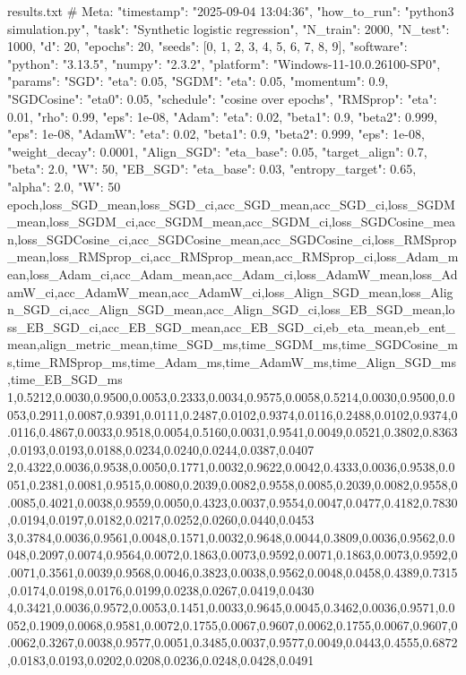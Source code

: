 \begin{filecontents*}{results.txt}
# Meta: {"timestamp": "2025-09-04 13:04:36", "how_to_run": "python3 simulation.py", "task": "Synthetic logistic regression", "N_train": 2000, "N_test": 1000, "d": 20, "epochs": 20, "seeds": [0, 1, 2, 3, 4, 5, 6, 7, 8, 9], "software": {"python": "3.13.5", "numpy": "2.3.2", "platform": "Windows-11-10.0.26100-SP0"}, "params": {"SGD": {"eta": 0.05}, "SGDM": {"eta": 0.05, "momentum": 0.9}, "SGDCosine": {"eta0": 0.05, "schedule": "cosine over epochs"}, "RMSprop": {"eta": 0.01, "rho": 0.99, "eps": 1e-08}, "Adam": {"eta": 0.02, "beta1": 0.9, "beta2": 0.999, "eps": 1e-08}, "AdamW": {"eta": 0.02, "beta1": 0.9, "beta2": 0.999, "eps": 1e-08, "weight_decay": 0.0001}, "Align_SGD": {"eta_base": 0.05, "target_align": 0.7, "beta": 2.0, "W": 50}, "EB_SGD": {"eta_base": 0.03, "entropy_target": 0.65, "alpha": 2.0, "W": 50}}}
epoch,loss_SGD_mean,loss_SGD_ci,acc_SGD_mean,acc_SGD_ci,loss_SGDM_mean,loss_SGDM_ci,acc_SGDM_mean,acc_SGDM_ci,loss_SGDCosine_mean,loss_SGDCosine_ci,acc_SGDCosine_mean,acc_SGDCosine_ci,loss_RMSprop_mean,loss_RMSprop_ci,acc_RMSprop_mean,acc_RMSprop_ci,loss_Adam_mean,loss_Adam_ci,acc_Adam_mean,acc_Adam_ci,loss_AdamW_mean,loss_AdamW_ci,acc_AdamW_mean,acc_AdamW_ci,loss_Align_SGD_mean,loss_Align_SGD_ci,acc_Align_SGD_mean,acc_Align_SGD_ci,loss_EB_SGD_mean,loss_EB_SGD_ci,acc_EB_SGD_mean,acc_EB_SGD_ci,eb_eta_mean,eb_ent_mean,align_metric_mean,time_SGD_ms,time_SGDM_ms,time_SGDCosine_ms,time_RMSprop_ms,time_Adam_ms,time_AdamW_ms,time_Align_SGD_ms,time_EB_SGD_ms
1,0.5212,0.0030,0.9500,0.0053,0.2333,0.0034,0.9575,0.0058,0.5214,0.0030,0.9500,0.0053,0.2911,0.0087,0.9391,0.0111,0.2487,0.0102,0.9374,0.0116,0.2488,0.0102,0.9374,0.0116,0.4867,0.0033,0.9518,0.0054,0.5160,0.0031,0.9541,0.0049,0.0521,0.3802,0.8363,0.0193,0.0193,0.0188,0.0234,0.0240,0.0244,0.0387,0.0407
2,0.4322,0.0036,0.9538,0.0050,0.1771,0.0032,0.9622,0.0042,0.4333,0.0036,0.9538,0.0051,0.2381,0.0081,0.9515,0.0080,0.2039,0.0082,0.9558,0.0085,0.2039,0.0082,0.9558,0.0085,0.4021,0.0038,0.9559,0.0050,0.4323,0.0037,0.9554,0.0047,0.0477,0.4182,0.7830,0.0194,0.0197,0.0182,0.0217,0.0252,0.0260,0.0440,0.0453
3,0.3784,0.0036,0.9561,0.0048,0.1571,0.0032,0.9648,0.0044,0.3809,0.0036,0.9562,0.0048,0.2097,0.0074,0.9564,0.0072,0.1863,0.0073,0.9592,0.0071,0.1863,0.0073,0.9592,0.0071,0.3561,0.0039,0.9568,0.0046,0.3823,0.0038,0.9562,0.0048,0.0458,0.4389,0.7315,0.0174,0.0198,0.0176,0.0199,0.0238,0.0267,0.0419,0.0430
4,0.3421,0.0036,0.9572,0.0053,0.1451,0.0033,0.9645,0.0045,0.3462,0.0036,0.9571,0.0052,0.1909,0.0068,0.9581,0.0072,0.1755,0.0067,0.9607,0.0062,0.1755,0.0067,0.9607,0.0062,0.3267,0.0038,0.9577,0.0051,0.3485,0.0037,0.9577,0.0049,0.0443,0.4555,0.6872,0.0183,0.0193,0.0202,0.0208,0.0236,0.0248,0.0428,0.0491

\end{filecontents*}
